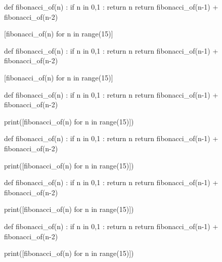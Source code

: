 \documentclass[a4paper,11pt]{article}
\begin{document}
\begin{codehigh}
\begin{NotebookPitonIn}[center]{0.75\linewidth}
def fibonacci_of(n) :
  if n in {0,1} :
    return n
  return fibonacci_of(n-1) + fibonacci_of(n-2)

[fibonacci_of(n) for n in range(15)]
\end{NotebookPitonIn}
\end{codehigh}

\begin{NotebookPitonIn}[center]{0.75\linewidth}
def fibonacci_of(n) :
	if n in {0,1} :
		return n
	return fibonacci_of(n-1) + fibonacci_of(n-2)

[fibonacci_of(n) for n in range(15)]
\end{NotebookPitonIn}

\begin{codehigh}
\begin{NotebookPitonOut}[center]{0.75\linewidth}
def fibonacci_of(n) :
  if n in {0,1} :
    return n
  return fibonacci_of(n-1) + fibonacci_of(n-2)

print([fibonacci_of(n) for n in range(15)])
\end{NotebookPitonOut}
\end{codehigh}

\begin{NotebookPitonOut}[center]{0.75\linewidth}
def fibonacci_of(n) :
	if n in {0,1} :
		return n
	return fibonacci_of(n-1) + fibonacci_of(n-2)

print([fibonacci_of(n) for n in range(15)])
\end{NotebookPitonOut}

\begin{codehigh}
\begin{NotebookPitonConsole}[center]{0.75\linewidth}
def fibonacci_of(n) :
  if n in {0,1} :
    return n
  return fibonacci_of(n-1) + fibonacci_of(n-2)

print([fibonacci_of(n) for n in range(15)])
\end{NotebookPitonConsole}
\end{codehigh}

\begin{NotebookPitonConsole}[center]{0.75\linewidth}
def fibonacci_of(n) :
	if n in {0,1} :
		return n
	return fibonacci_of(n-1) + fibonacci_of(n-2)

print([fibonacci_of(n) for n in range(15)])
\end{NotebookPitonConsole}

\pagebreak
\end{document}
